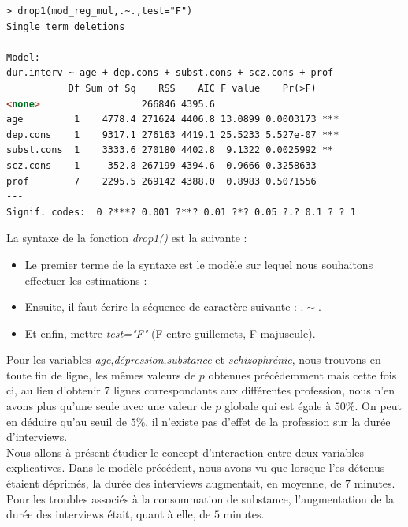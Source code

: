 \begin{lstlisting}[language=html]
> drop1(mod_reg_mul,.~.,test="F")
Single term deletions

Model:
dur.interv ~ age + dep.cons + subst.cons + scz.cons + prof
           Df Sum of Sq    RSS    AIC F value    Pr(>F)    
<none>                  266846 4395.6                      
age         1    4778.4 271624 4406.8 13.0899 0.0003173 ***
dep.cons    1    9317.1 276163 4419.1 25.5233 5.527e-07 ***
subst.cons  1    3333.6 270180 4402.8  9.1322 0.0025992 ** 
scz.cons    1     352.8 267199 4394.6  0.9666 0.3258633    
prof        7    2295.5 269142 4388.0  0.8983 0.5071556    
---
Signif. codes:  0 ?***? 0.001 ?**? 0.01 ?*? 0.05 ?.? 0.1 ? ? 1
\end{lstlisting}

La syntaxe de la fonction \textit{drop1()} est la suivante : 
\begin{itemize}
\item Le premier terme de la syntaxe est le modèle sur lequel nous souhaitons effectuer les estimations : 
\item Ensuite, il faut écrire la séquence de caractère suivante : $.\sim .$
\item Et enfin, mettre \textit{ test="F"} (F entre guillemets, F majuscule).
\end{itemize}
Pour les variables \textit{age},\textit{dépression},\textit{substance} et \textit{schizophrénie}, nous trouvons en toute fin de ligne, les mêmes valeurs de $p$ obtenues précédemment mais cette fois ci, au lieu d'obtenir $7$ lignes correspondants aux différentes profession, nous n'en avons plus qu'une seule avec une valeur de $p$ globale qui est égale à $50\%$.\newline
On peut en déduire qu'au seuil de $5\%$, il n'existe pas d'effet de la profession sur la durée d'interviews.\newline
\\

Nous allons à présent étudier le concept d'interaction entre deux variables explicatives.\newline
Dans le modèle précédent, nous avons vu que lorsque l'es détenus étaient déprimés, la durée des interviews augmentait, en moyenne, de $7$ minutes. Pour les troubles associés à la consommation de substance, l'augmentation de la durée des interviews était, quant à elle, de $5$ minutes. \newline


